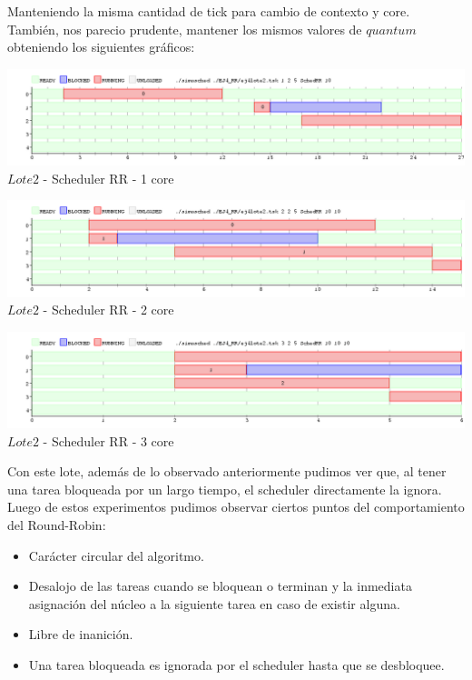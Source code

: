 \indent Manteniendo la misma cantidad de tick para cambio de contexto y core. También, nos parecio prudente, mantener
los mismos valores de $quantum$ obteniendo los siguientes gráficos:

\begin{center}
    	\includegraphics[width=450pt]{./EJ4_RR/ejercicio4-2lote1nucleo.png}
	{$Lote 2$ - Scheduler RR - 1 core}	
 \end{center}

 \begin{center}
    	\includegraphics[width=450pt]{./EJ4_RR/ejercicio4-2lote2nucleo.png}
	{$Lote 2$ - Scheduler RR - 2 core}	
 \end{center}
 
 \begin{center}
    	\includegraphics[width=450pt]{./EJ4_RR/ejercicio4-2lote3nucleo.png}
	{$Lote 2$ - Scheduler RR - 3 core}	
 \end{center}

 \indent Con este lote, además de lo observado anteriormente pudimos ver que, al tener una tarea bloqueada
 por un largo tiempo, el scheduler directamente la ignora.\\
 
\indent Luego de estos experimentos pudimos observar ciertos puntos del comportamiento del Round-Robin:\\
\begin{itemize}
\item  Carácter circular del algoritmo.
\item  Desalojo de las tareas cuando se bloquean o terminan y la inmediata asignación del núcleo a la siguiente tarea en caso de existir alguna.
\item  Libre de inanición.
\item  Una tarea bloqueada es ignorada por el scheduler hasta que se desbloquee.
\end{itemize}

